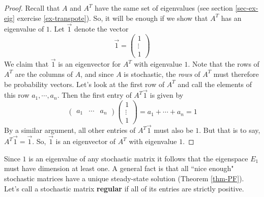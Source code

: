 \documentclass[12pt]{article}
\numberwithin{equation}{subsection}
\numberwithin{figure}{subsection}
\theoremstyle{note}
\begin{document}
\begin{proof}
	Recall that $A$ and $A^T$ have the same set of eigenvalues (see section \ref{sec-ex-eig} exercise \ref{ex-transpote}). So, it will be enough if we show that $A^T$ has an eigenvalue of $1$. Let $\vec{1}$ denote the vector \[\vec{1}=\begin{pmatrix} 1 \\ \vdots \\ 1\end{pmatrix}\] We claim that $\vec{1}$ is an eigenvector for $A^T$ with eigenvalue $1$. Note that the rows of $A^T$ are the columns of $A$, and since $A$ is stochastic, the \textit{rows} of $A^T$ must therefore be probability vectors.  Let's look at the first row of $A^T$ and call the elements of this row $a_1, \cdots, a_n$. Then the first entry of $A^T \vec{1}$ is given by \[ \begin{pmatrix} a_1 & \cdots & a_n\end{pmatrix} \begin{pmatrix} 1 \\ \vdots \\ 1\end{pmatrix}=a_1+\cdots +a_n=1\] By a similar argument, all other entries of $A^T\vec{1}$ must also be $1$. But that is to say, $A^T \vec{1}=\vec{1}$. So, $\vec{1}$ is an eigenvector of $A^T$ with eigenvalue $1$.
\end{proof}

Since $1$ is an eigenvalue of any stochastic matrix it follows that the eigenspace $E_1$ must have dimension at least one. A general fact is that all ``nice enough" stochastic matrices have a unique steady-state solution (Theorem \ref{thm-PF}). Let's call a stochastic matrix \textbf{regular} if all of its entries are strictly positive. 
\end{document}
